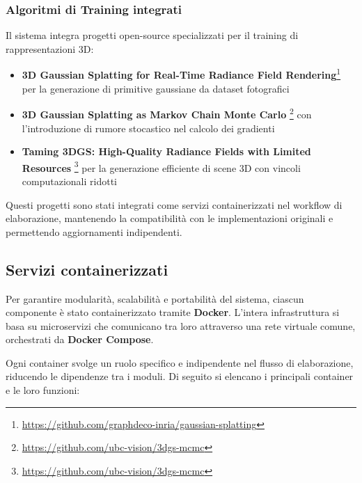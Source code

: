 \subsubsection{Algoritmi di Training integrati}
Il sistema integra progetti open-source specializzati per il training di rappresentazioni 3D:
\begin{itemize}
	\item \textbf{3D Gaussian Splatting
		for Real-Time Radiance Field Rendering}\footnote{\url{https://github.com/graphdeco-inria/gaussian-splatting}} per la generazione di primitive gaussiane da dataset fotografici
	\item \textbf{3D Gaussian Splatting as Markov Chain Monte Carlo
	}\footnote{\url{https://github.com/ubc-vision/3dgs-mcmc}} con l'introduzione di rumore stocastico nel calcolo dei gradienti
	\item \textbf{Taming 3DGS: High-Quality Radiance Fields with Limited Resources
	}\footnote{\url{https://github.com/ubc-vision/3dgs-mcmc}} per la generazione efficiente di scene 3D con vincoli computazionali ridotti
\end{itemize}
Questi progetti sono stati integrati come servizi containerizzati nel workflow di elaborazione, mantenendo la compatibilità con le implementazioni originali e permettendo aggiornamenti indipendenti.

\subsection{Servizi containerizzati}
\label{sec:servizi_containerizzati}

Per garantire modularità, scalabilità e portabilità del sistema, ciascun componente è stato containerizzato tramite \textbf{Docker}. L'intera infrastruttura si basa su microservizi che comunicano tra loro attraverso una rete virtuale comune, orchestrati da \textbf{Docker Compose}.

Ogni container svolge un ruolo specifico e indipendente nel flusso di elaborazione, riducendo le dipendenze tra i moduli. Di seguito si elencano i principali container e le loro funzioni:

